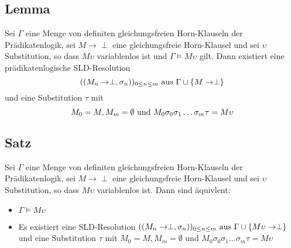 \documentclass[12pt,a4paper]{report}
\newcommand{\ra}{\rightarrow}
\newcommand{\green}[1]{\textcolor[rgb]{0.1,0.6,0.1}{#1}}
\begin{document}
\subsection{\green{Lemma}}
Sei $ \Gamma $ eine Menge von definiten gleichungsfreien Horn-Klauseln der Prädikatenlogik, sei $ M \ra \perp $ eine gleichungsfreie Horn-Klausel und sei $ \upsilon $ Substitution, so dass $ M \upsilon $ variablenlos ist und $ \Gamma \vDash M \upsilon $ gilt.\newline
Dann existiert eine prädikatenlogische SLD-Resolution
\[
    ((M_n \ra \perp, \sigma_n))_{0 \leq n \leq m} \textnormal{ aus } \Gamma \cup \{M \ra \perp\}
\]
und eine Substitution $ \tau $ mit
\[
    M_0 = M, M_m = \emptyset \textnormal{ und } M_0\sigma_0\sigma_1\dots\sigma_m \tau = M\upsilon
\]
\subsection{\green{Satz}}
Sei $ \Gamma $ eine Menge von definiten gleichungsfreien Horn-Klauseln der Prädikatenlogik, sei $ M \ra \perp $ eine gleichungsfreie Horn-Klausel und sei $ \upsilon $ Substitution, so dass $ M \upsilon $ variablenlos ist. Dann sind äquivlent:
\begin{itemize}
    \item $ \Gamma \vDash M \upsilon $
    \item Es existiert eine SLD-Resolution $ ((M_n \ra \perp, \sigma_n))_{0 \leq n \leq m} \textnormal{ aus } \Gamma \cup \{M \upsilon \ra \perp\} $ und eine Substitution $ \tau $ mit $ M_0 = M, M_m = \emptyset $ und $ M_0\sigma_0\sigma_1\dots\sigma_m \tau = M\upsilon $
\end{itemize}
\end{document}
